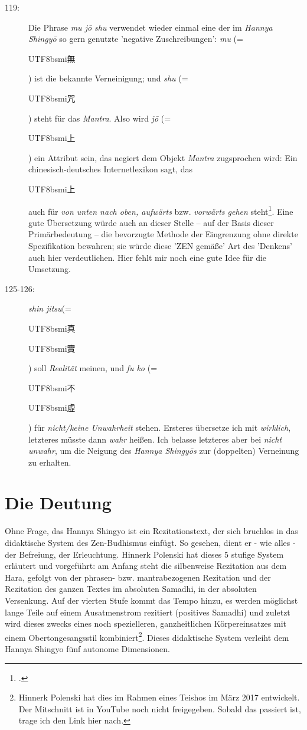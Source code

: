 \documentclass[
DIV=calc,
BCOR=5mm,
11pt,
headings=small,
oneside,
bibtotocnumbered]{scrartcl}
\newcommand{\cnbsmi}[1]{\begin{CJK}{UTF8}{bsmi}#1\end{CJK}}
\begin{document}
\begin{description}
  \item[119:] Die Phrase \emph{mu jō shu} verwendet wieder einmal eine der im
  \emph{Hannya Shingyō} so gern genutzte 'negative Zuschreibungen':
  \emph{mu} (= \cnbsmi{無}) ist die bekannte Verneinigung; und \emph{shu} (=
  \cnbsmi{咒}) steht für das \emph{Mantra}. Also wird \emph{jō} (= \cnbsmi{上})
  ein Attribut sein, das negiert dem Objekt \emph{Mantra} zugsprochen wird:
  Ein chinesisch-deutsches Internetlexikon sagt, das \cnbsmi{上} auch für
  \emph{von unten nach oben, aufwärts} bzw. \emph{vorwärts gehen}
  steht\footcite[vgl.][\nopage]{babla2016a}. Eine gute Übersetzung würde auch an
  dieser Stelle -- auf der Basis dieser Primärbedeutung -- die bevorzugte
  Methode der Eingrenzung ohne direkte Spezifikation bewahren; sie würde diese
  'ZEN gemäße' Art des 'Denkens' auch hier verdeutlichen. Hier fehlt mir noch
  eine gute Idee für die Umsetzung.

  \item[125-126:] \emph{shin jitsu}(= \cnbsmi{真} \cnbsmi{實}) soll
  \emph{Realität} meinen, und \emph{fu ko} (= \cnbsmi{不} \cnbsmi{虛} ) für
  \emph{nicht/keine Unwahrheit} stehen. Ersteres übersetze ich mit
  \emph{wirklich}, letzteres müsste dann \emph{wahr} heißen. Ich belasse
  letzteres aber bei \emph{nicht unwahr}, um die Neigung des \emph{Hannya
  Shingyōs} zur (doppelten) Verneinung zu erhalten.
\end{description}

\section{Die Deutung}

Ohne Frage, das Hannya Shingyo ist ein Rezitationstext, der sich bruchlos in das
didaktische System des Zen-Budhismus einfügt. So gesehen, dient er - wie alles -
der Befreiung, der Erleuchtung. Hinnerk Polenski hat dieses 5 stufige System
erläutert und vorgeführt: am Anfang steht die silbenweise Rezitation aus dem
Hara, gefolgt von der phrasen- bzw. mantrabezogenen Rezitation und der
Rezitation des ganzen Textes im absoluten Samadhi, in der absoluten Versenkung.
Auf der vierten Stufe kommt das Tempo hinzu, es werden möglichst lange Teile auf
einem Ausatmenstrom rezitiert (positives Samadhi) und zuletzt wird dieses
zwecks eines noch spezielleren, ganzheitlichen Körpereinsatzes mit einem
Obertongesangsstil kombiniert\footnote{Hinnerk Polenski hat dies im Rahmen
eines Teishos im März 2017 entwickelt. Der Mitschnitt ist in YouTube noch
nicht freigegeben. Sobald das passiert ist, trage ich den Link hier nach.}.
Dieses didaktische System verleiht dem Hannya Shingyo fünf autonome Dimensionen.
\end{document}
